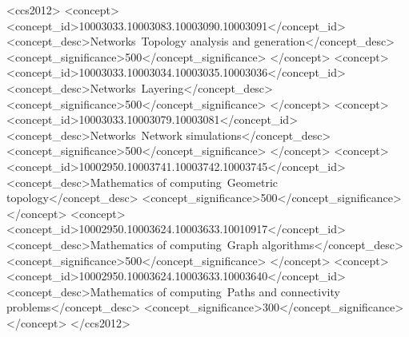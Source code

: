 \documentclass[acmsmall, screen]{acmart}
\begin{document}
\begin{CCSXML}
<ccs2012>
    <concept>
    <concept_id>10003033.10003083.10003090.10003091</concept_id>
    <concept_desc>Networks~Topology analysis and generation</concept_desc>
    <concept_significance>500</concept_significance>
    </concept>
   <concept>
       <concept_id>10003033.10003034.10003035.10003036</concept_id>
       <concept_desc>Networks~Layering</concept_desc>
       <concept_significance>500</concept_significance>
       </concept>
   <concept>
       <concept_id>10003033.10003079.10003081</concept_id>
       <concept_desc>Networks~Network simulations</concept_desc>
       <concept_significance>500</concept_significance>
       </concept>
    <concept>
       <concept_id>10002950.10003741.10003742.10003745</concept_id>
       <concept_desc>Mathematics of computing~Geometric topology</concept_desc>
       <concept_significance>500</concept_significance>
       </concept>
   <concept>
       <concept_id>10002950.10003624.10003633.10010917</concept_id>
       <concept_desc>Mathematics of computing~Graph algorithms</concept_desc>
       <concept_significance>500</concept_significance>
       </concept>
   <concept>
       <concept_id>10002950.10003624.10003633.10003640</concept_id>
       <concept_desc>Mathematics of computing~Paths and connectivity problems</concept_desc>
       <concept_significance>300</concept_significance>
       </concept>
 </ccs2012>
\end{CCSXML}



\maketitle
\end{document}

